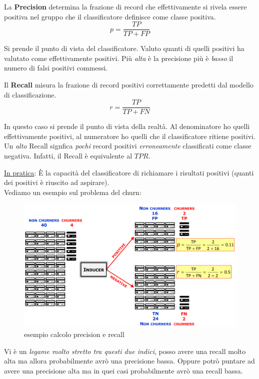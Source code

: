 \begin{defn}
	La \textbf{Precision} determina la frazione di record che effettivamente si rivela essere positiva nel gruppo che il classificatore definisce come classe positiva. 
	\[p = \frac{TP}{TP+FP}\]
\end{defn}
Si prende il punto di vista del classificatore. Valuto quanti di quelli positivi ha valutato come effettivamente positivi. Più \textit{alta} è la precisione più è \textit{basso} il numero di falsi positivi commessi.

\begin{defn}
	Il \textbf{Recall} misura la frazione di record positivi correttamente predetti dal modello di classificazione.
	\[r = \frac{TP}{TP+FN}\]
\end{defn}
In questo caso si prende il punto di vista della realt\`a. Al denominatore ho quelli effettivamente positivi, al numeratore ho quelli che il classificatore ritiene positivi. Un \textit{alto} Recall signfica \textit{pochi} record positivi \textit{erroneamente} classificati come classe negativa. Infatti, il Recall è equivalente al $TPR$.

\underline{In pratica}: \`E la capacit\`a del classificatore di richiamare i risultati positivi (quanti dei positivi \`e riuscito ad aspirare). \\

Vediamo un esempio sul problema del churn:
\begin{figure}[H]
	\hspace{-0.2cm}
	\includegraphics[height=0.6 \linewidth]{classification/pict/esPrecisionRecall_merge.png}
	\caption{esempio calcolo precision e recall}
\end{figure}
Vi \`e un \textit{legame molto stretto tra questi due indici}, posso avere una recall molto alta ma allora probabilmente avrò una precisione bassa. Oppure potrò puntare ad avere una precisione alta ma in quei casi probabilmente avrò una recall bassa.

